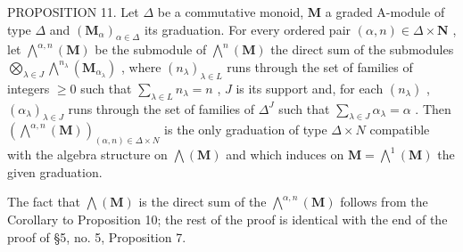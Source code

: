 PROPOSITION 11. Let \(\Delta\) be a commutative monoid, \(\mathbf{M}\) a graded A-module of type \(\Delta\) and \((\mathbf{M}_{\alpha})_{\alpha \in \Delta}\) its graduation. For every ordered pair \((\alpha, n) \in \Delta \times \mathbf{N}\) , let \(\bigwedge^{\alpha, n}(\mathbf{M})\) be the submodule of \(\bigwedge^n (\mathbf{M})\) the direct sum of the submodules \(\bigotimes_{\lambda \in J} \bigwedge^{n_{\lambda}}(\mathbf{M}_{\alpha_{\lambda}})\) , where \((n_{\lambda})_{\lambda \in L}\) runs through the set of families of integers \(\geqslant 0\) such that \(\sum_{\lambda \in L} n_{\lambda} = n\) , \(J\) is its support and, for each \((n_{\lambda})\) , \((\alpha_{\lambda})_{\lambda \in J}\) runs through the set of families of \(\Delta^J\) such that \(\sum_{\lambda \in J} \alpha_{\lambda} = \alpha\) . Then \((\bigwedge^{\alpha, n}(\mathbf{M}))_{(\alpha, n) \in \Delta \times N}\) is the only graduation of type \(\Delta \times N\) compatible with the algebra structure on \(\bigwedge(\mathbf{M})\) and which induces on \(\mathbf{M} = \bigwedge^1 (\mathbf{M})\) the given graduation.

The fact that \(\bigwedge (\mathbf{M})\) is the direct sum of the \(\bigwedge^{\alpha ,n}(\mathbf{M})\) follows from the Corollary to Proposition 10; the rest of the proof is identical with the end of the proof of §5, no. 5, Proposition 7.

